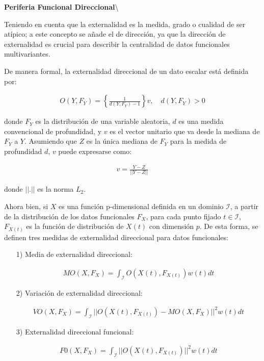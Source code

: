 \documentclass[
]{book}
\begin{document}
\textbf{Periferia Funcional Direccional}\textbackslash{}

Teniendo en cuenta que la externalidad es la medida, grado o cualidad de ser atípico; a este concepto se añade el de dirección, ya que la dirección de externalidad es crucial para describir la centralidad de datos funcionales multivariantes.

De manera formal, la externalidad direccional de un dato escalar está definida por:

\begin{align*}
    O(Y,F_Y)=\left\{\frac{1}{d(Y,F_Y)-1}\right\}v,\quad d(Y,F_Y)>0
\end{align*}

donde \(F_Y\) es la distribución de una variable aleatoria, \(d\) es una medida convencional de profundidad, y \(v\) es el vector unitario que va desde la mediana de \(F_Y\) a \(Y\). Asumiendo que \(Z\) es la única mediana de \(F_Y\) para la medida de profundidad \(d\), \(v\) puede expresarse como:

\begin{align*}
    v=\frac{Y-Z}{||Y-Z||}
\end{align*}

donde \(||.||\) es la norma \(L_2\).

Ahora bien, si \(X\) es una función p-dimensional definida en un dominio \(\mathcal{I}\), a partir de la distribución de los datos funcionales \(F_X\), para cada punto fijado \(t \in \mathcal{I}\), \(F_{X(t)}\) es la función de distribución de \(X(t)\) con dimensión \(p\). De esta forma, se definen tres medidas de externalidad direccional para datos funcionales:

\begin{itemize}
    \item[1)] Media de externalidad direccional:
    
    \begin{align*}
        MO(X,F_X)=\int_\mathcal{I}O(X(t),F_{X(t)})w(t)dt
    \end{align*}
    
    \item[2)] Variación de externalidad direccional:
    
    \begin{align*}
        VO(X,F_{X})=\int_\mathcal{I} ||O(X(t),F_{X(t)})-MO(X,F_{X})||^2 w(t) dt
    \end{align*}
    
    \item[3)] Externalidad direccional funcional:
    
    \begin{align*}
        F0(X,F_X)=\int_\mathcal{I}||O(X(t),F_{X(t)})||^2w(t)dt
    \end{align*}
    
\end{itemize}
\end{document}
